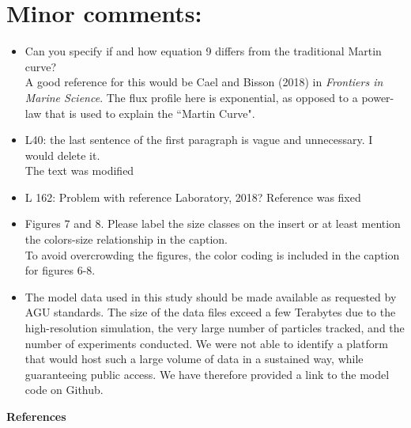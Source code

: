 \documentclass[12pt,letter]{article}
\begin{document}
\section*{Minor comments:}
\begin{itemize}
	\item Can you specify if and how equation 9 differs from the traditional Martin curve?\\
	{\color{blue} A good reference for this would be Cael and Bisson (2018) in \textit{Frontiers in Marine Science}. The flux profile here is exponential, as opposed to a power-law that is used to explain the ``Martin Curve".}
	

	\item L40: the last sentence of the first paragraph is vague and unnecessary. I would delete it.\\
	{\color{blue} The text was modified\\}
	\item L 162: Problem with reference Laboratory, 2018?
	{\color{blue} Reference was fixed\\}
	\item Figures 7 and 8. Please label the size classes on the insert or at least mention the colors-size relationship in the caption.\\
	{\color{blue} To avoid overcrowding the figures, the color coding is included in the caption for figures 6-8.\\}


	\item The model data used in this study should be made available as requested by AGU standards.
	{\color{blue} The size of the data files exceed a few Terabytes due to the high-resolution simulation,  the very large number of particles tracked, and the number of experiments conducted. We were not able to identify a platform that would host such a large volume of data in a sustained way, while guaranteeing public access. We have therefore provided a link to the model code on Github.\\}
\end{itemize}

{\bf References}\\
\end{document}
